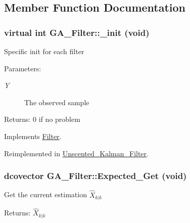 \subsection{Member Function Documentation}
\hypertarget{class_g_a___filter_7b5cb872bcedd752a4309f114625a4b8}{
\subsubsection[{\_\-init}]{\setlength{\rightskip}{0pt plus 5cm}virtual int GA\_\-Filter::\_\-init (void)}}
\label{class_g_a___filter_7b5cb872bcedd752a4309f114625a4b8}


Specific init for each filter

\begin{Desc}
\item[Parameters:]
\begin{description}
\item[{\em Y}]The observed sample\end{description}
\end{Desc}
\begin{Desc}
\item[Returns:]0 if no problem \end{Desc}


Implements \hyperlink{class_filter_f46a456184971270ca36733d937f14fb}{Filter}.

Reimplemented in \hyperlink{class_unscented___kalman___filter_a6ca6d9f8b5a4a40c18b6cdfdc2029fa}{Unscented\_\-Kalman\_\-Filter}.\hypertarget{class_g_a___filter_e92898cc15e34358cb9ecabd57067a39}{
\subsubsection[{Expected\_\-Get}]{\setlength{\rightskip}{0pt plus 5cm}dcovector GA\_\-Filter::Expected\_\-Get (void)}}
\label{class_g_a___filter_e92898cc15e34358cb9ecabd57067a39}


Get the current estimation $ \hat{X}_{k|k} $

\begin{Desc}
\item[Returns:]$ \hat{X}_{k|k} $ \end{Desc}


